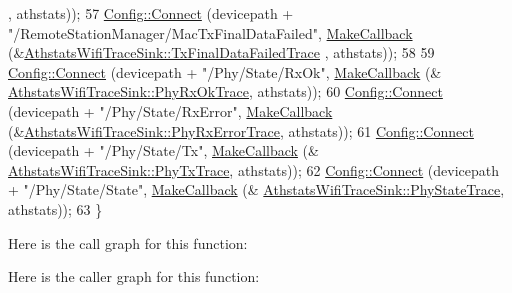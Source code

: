 \begin{DoxyCode}
      , athstats));
57   \hyperlink{group__config_ga4014f151241cd0939b6cb64409605736}{Config::Connect} (devicepath + \textcolor{stringliteral}{"/RemoteStationManager/MacTxFinalDataFailed"}, 
      \hyperlink{group__makecallbackmemptr_ga9376283685aa99d204048d6a4b7610a4}{MakeCallback} (&\hyperlink{classns3_1_1AthstatsWifiTraceSink_a29e9dddeb7bd821037a2ff8edeba1353}{AthstatsWifiTraceSink::TxFinalDataFailedTrace}
      , athstats));
58 
59   \hyperlink{group__config_ga4014f151241cd0939b6cb64409605736}{Config::Connect} (devicepath + \textcolor{stringliteral}{"/Phy/State/RxOk"}, \hyperlink{group__makecallbackmemptr_ga9376283685aa99d204048d6a4b7610a4}{MakeCallback} (&
      \hyperlink{classns3_1_1AthstatsWifiTraceSink_ad3543beb6f37c802b7bf53560adc9413}{AthstatsWifiTraceSink::PhyRxOkTrace}, athstats));
60   \hyperlink{group__config_ga4014f151241cd0939b6cb64409605736}{Config::Connect} (devicepath + \textcolor{stringliteral}{"/Phy/State/RxError"}, 
      \hyperlink{group__makecallbackmemptr_ga9376283685aa99d204048d6a4b7610a4}{MakeCallback} (&\hyperlink{classns3_1_1AthstatsWifiTraceSink_a6e65ff0ceae205118fc40867f18988e5}{AthstatsWifiTraceSink::PhyRxErrorTrace}, 
      athstats));
61   \hyperlink{group__config_ga4014f151241cd0939b6cb64409605736}{Config::Connect} (devicepath + \textcolor{stringliteral}{"/Phy/State/Tx"}, \hyperlink{group__makecallbackmemptr_ga9376283685aa99d204048d6a4b7610a4}{MakeCallback} (&
      \hyperlink{classns3_1_1AthstatsWifiTraceSink_a84f788ebed6522f48a3b36ea173650c2}{AthstatsWifiTraceSink::PhyTxTrace}, athstats));
62   \hyperlink{group__config_ga4014f151241cd0939b6cb64409605736}{Config::Connect} (devicepath + \textcolor{stringliteral}{"/Phy/State/State"}, \hyperlink{group__makecallbackmemptr_ga9376283685aa99d204048d6a4b7610a4}{MakeCallback} (&
      \hyperlink{classns3_1_1AthstatsWifiTraceSink_afd9ade5a7788f583681de3068d03d1d5}{AthstatsWifiTraceSink::PhyStateTrace}, athstats));
63 \}
\end{DoxyCode}


Here is the call graph for this function\+:




Here is the caller graph for this function\+:


